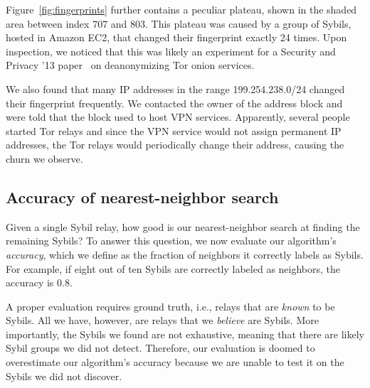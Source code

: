 Figure~\ref{fig:fingerprints} further contains a peculiar plateau, shown in the
shaded area between index 707 and 803.  This plateau was caused by a group of
Sybils, hosted in Amazon EC2, that changed their fingerprint exactly 24 times.
Upon inspection, we noticed that this was likely an experiment for a Security
and Privacy '13 paper~\cite{Biryukov2013a} on deanonymizing Tor onion services.

We also found that many IP addresses in the range 199.254.238.0/24 changed their
fingerprint frequently.  We contacted the owner of the address block and were
told that the block used to host VPN services.  Apparently, several people
started Tor relays and since the VPN service would not assign permanent IP
addresses, the Tor relays would periodically change their address, causing the
churn we observe.

\subsection{Accuracy of nearest-neighbor search}
\label{sec:accuracy}
Given a single Sybil relay, how good is our nearest-neighbor search at finding
the remaining Sybils?  To answer this question, we now evaluate our algorithm's
\emph{accuracy}, which we define as the fraction of neighbors it correctly
labels as Sybils.  For example, if eight out of ten Sybils are correctly labeled
as neighbors, the accuracy is 0.8.

A proper evaluation requires ground truth, i.e., relays that are \emph{known} to
be Sybils.  All we have, however, are relays that we \emph{believe} are Sybils.
More importantly, the Sybils we found are not exhaustive, meaning that there are
likely Sybil groups we did not detect.  Therefore, our evaluation is doomed to
overestimate our algorithm's accuracy because we are unable to test it on the
Sybils we did not discover.

